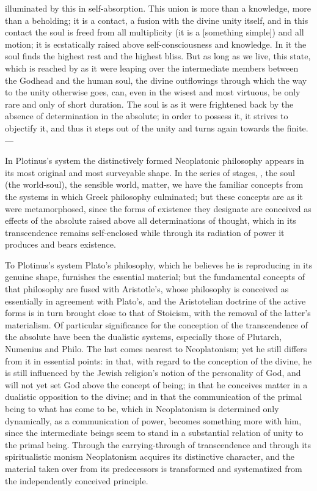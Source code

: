 illuminated by this in self-absorption. This union is more than a
knowledge, more than a beholding; it is a contact, a fusion with the
divine unity itself, and in this contact the soul is freed from all
multiplicity (it is a  [something simple]) and all motion; it is
ecstatically raised above self-consciousness and knowledge.
In it the soul finds the highest rest and the highest bliss. But as
long as we live, this state, which is reached by as it were leaping
over the intermediate members between the Godhead and the human soul,
the divine outflowings through which the way to the unity otherwise
goes, can, even in the wisest and most virtuous, be only rare and only
of short duration. The soul is as it were frightened back by the
absence of determination in the absolute; in order to possess it, it
strives to objectify it, and thus it steps out of the unity and turns
again towards the finite. ---

In Plotinus's system the distinctively formed Neoplatonic philosophy
appears in its most original and most surveyable shape. In the series
of stages, , the soul (the world-soul), the sensible world,
matter, we have the familiar concepts from the systems in which Greek
philosophy culminated; but these concepts are as it were metamorphosed,
since the forms of existence they designate are conceived as effects
of the absolute raised above all determinations of thought, which in
its transcendence remains self-enclosed while through its radiation of
power it produces and bears existence.

To Plotinus's system Plato's philosophy, which he believes he is
reproducing in its genuine shape, furnishes the essential material; but
the fundamental concepts of that philosophy are fused with Aristotle's,
whose philosophy is conceived as essentially in agreement with Plato's,
and the Aristotelian doctrine of the active forms is in turn brought
close to that of Stoicism, with the removal of the latter's
materialism. Of particular significance for the conception of the
transcendence of the absolute have been the dualistic systems,
especially those of Plutarch, Numenius and Philo. The last comes nearest
to Neoplatonism; yet he still differs from it in essential points: in
that, with regard to the conception of the divine, he is still
influenced by the Jewish religion's notion of the personality of God,
and will not yet set God above the concept of being; in that he
conceives matter in a dualistic opposition to the
divine; and in that the communication of the primal being to
what has come to be, which in Neoplatonism is determined only
dynamically, as a communication of power, becomes something more with
him, since the intermediate beings seem to stand in a substantial
relation of unity to the primal being. Through the carrying-through of
transcendence and through its spiritualistic monism Neoplatonism
acquires its distinctive character, and the material taken over from
its predecessors is transformed and systematized from the independently
conceived principle.

